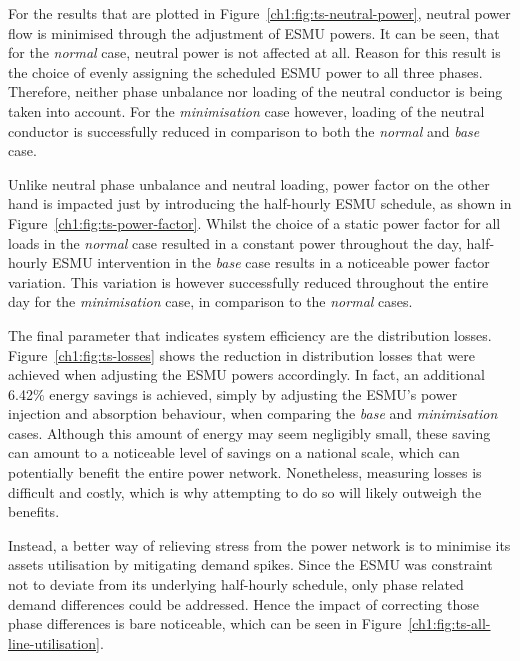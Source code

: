 For the results that are plotted in Figure~\ref{ch1:fig:ts-neutral-power}, neutral power flow is minimised through the adjustment of ESMU powers.
It can be seen, that for the \textit{normal} case, neutral power is not affected at all.
Reason for this result is the choice of evenly assigning the scheduled ESMU power to all three phases.
Therefore, neither phase unbalance nor loading of the neutral conductor is being taken into account.
For the \textit{minimisation} case however, loading of the neutral conductor is successfully reduced in comparison to both the \textit{normal} and \textit{base} case.



Unlike neutral phase unbalance and neutral loading, power factor on the other hand is impacted just by introducing the half-hourly ESMU schedule, as shown in Figure~\ref{ch1:fig:ts-power-factor}.
Whilst the choice of a static power factor for all loads in the \textit{normal} case resulted in a constant power throughout the day, half-hourly ESMU intervention in the \textit{base} case results in a noticeable power factor variation.
This variation is however successfully reduced throughout the entire day for the \textit{minimisation} case, in comparison to the \textit{normal} cases.



The final parameter that indicates system efficiency are the distribution losses.
Figure~\ref{ch1:fig:ts-losses} shows the reduction in distribution losses that were achieved when adjusting the ESMU powers accordingly.
In fact, an additional 6.42\% energy savings is achieved, simply by adjusting the ESMU's power injection and absorption behaviour, when comparing the \textit{base} and \textit{minimisation} cases.
Although this amount of energy may seem negligibly small, these saving can amount to a noticeable level of savings on a national scale, which can potentially benefit the entire power network.
Nonetheless, measuring losses is difficult and costly, which is why attempting to do so will likely outweigh the benefits.

Instead, a better way of relieving stress from the power network is to minimise its assets utilisation by mitigating demand spikes.
Since the ESMU was constraint not to deviate from its underlying half-hourly schedule, only phase related demand differences could be addressed.
Hence the impact of correcting those phase differences is bare noticeable, which can be seen in Figure~\ref{ch1:fig:ts-all-line-utilisation}.

